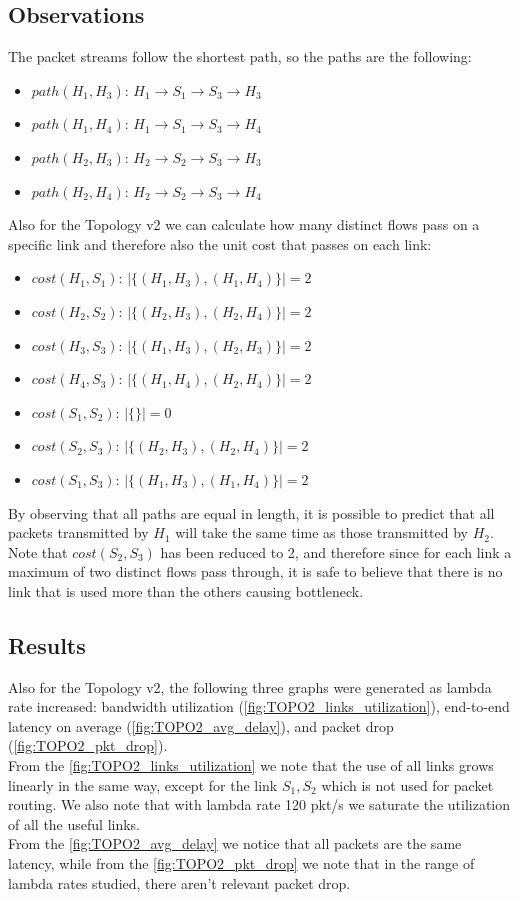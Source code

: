 \documentclass{article}
\begin{document}
\subsection{Observations}
The packet streams follow the shortest path, so the paths are the following:
\begin{itemize}
    \item $path(H_1, H_3)$: $H_1 \rightarrow S_1 \rightarrow S_3 \rightarrow H_3$
    \item $path(H_1, H_4)$: $H_1 \rightarrow S_1 \rightarrow S_3 \rightarrow H_4$
    \item $path(H_2, H_3)$: $H_2 \rightarrow S_2 \rightarrow S_3 \rightarrow H_3$
    \item $path(H_2, H_4)$: $H_2 \rightarrow S_2 \rightarrow S_3 \rightarrow H_4$
\end{itemize}
Also for the Topology v2 we can calculate how many distinct flows pass on a specific link and therefore also the unit cost that passes on each link:
\begin{itemize}
    \item $cost(H_1, S_1)$: $|\{(H_1, H_3), (H_1, H_4)\}| = 2$
    \item $cost(H_2, S_2)$: $|\{(H_2, H_3), (H_2, H_4)\}| = 2$
    \item $cost(H_3, S_3)$: $|\{(H_1, H_3), (H_2, H_3)\}| = 2$
    \item $cost(H_4, S_3)$: $|\{(H_1, H_4), (H_2, H_4)\}| = 2$
    \item $cost(S_1, S_2)$: $|\{\}| = 0$
    \item $cost(S_2, S_3)$: $|\{(H_2, H_3), (H_2, H_4)\}| = 2$
    \item $cost(S_1, S_3)$: $|\{(H_1, H_3), (H_1, H_4)\}| = 2$
\end{itemize}
By observing that all paths are equal in length, it is possible to predict that all packets transmitted by $H_1$ will take the same time as those transmitted by $H_2$.
Note that $cost(S_2, S_3)$ has been reduced to 2, and therefore since for each link a maximum of two distinct flows pass through, it is safe to believe that there is no link that is used more than the others causing bottleneck.

\subsection{Results}
Also for the Topology v2, the following three graphs were generated as lambda rate increased: bandwidth utilization (\autoref{fig:TOPO2_links_utilization}), end-to-end latency on average (\autoref{fig:TOPO2_avg_delay}), and packet drop (\autoref{fig:TOPO2_pkt_drop}). \\
From the \autoref{fig:TOPO2_links_utilization} we note that the use of all links grows linearly in the same way, except for the link $S_1, S_2$ which is not used for packet routing. We also note that with lambda rate 120 pkt/s we saturate the utilization of all the useful links.\\
From the \autoref{fig:TOPO2_avg_delay} we notice that all packets are the same latency, while from the \autoref{fig:TOPO2_pkt_drop} we note that in the range of lambda rates studied, there aren't relevant packet drop.\\
\end{document}
